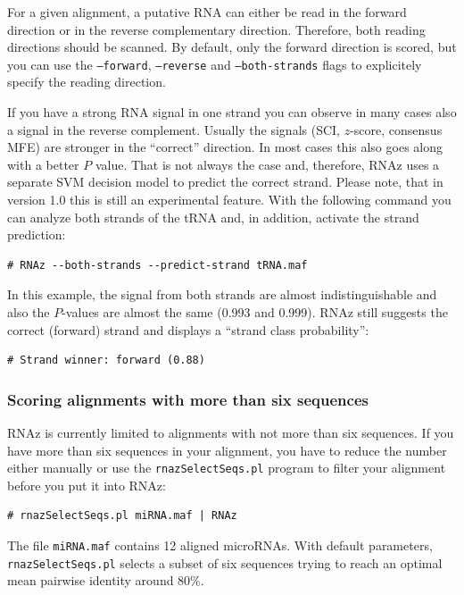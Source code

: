 \documentclass[11pt]{article}
\begin{document}
For a given alignment, a putative RNA can either be read in the forward
direction or in the reverse complementary direction. Therefore, both
reading directions should be scanned. By default, only the forward
direction is scored, but you can use the \texttt{--forward},
\texttt{--reverse} and \texttt{--both-strands} flags to explicitely specify the
reading direction. 

If you have a strong RNA signal in one strand you can observe in many cases
also a signal in the reverse complement.  Usually the signals (SCI,
$z$-score, consensus MFE) are stronger in the ``correct'' direction. In
most cases this also goes along with a better $P$ value.  That is not
always the case and, therefore, RNAz uses a separate SVM decision model to
predict the correct strand. Please note, that in version 1.0 this is still
an experimental feature. With the following command you can analyze both
strands of the tRNA and, in addition, activate the strand prediction:

\begin{verbatim}
# RNAz --both-strands --predict-strand tRNA.maf
\end{verbatim}

In this example, the signal from both strands are almost indistinguishable
and also the $P$-values are almost the same (0.993 and 0.999).
RNAz still suggests the correct (forward) strand and displays a
``strand class probability'':

\begin{verbatim}
# Strand winner: forward (0.88)
\end{verbatim}

\subsubsection{Scoring alignments with more than six sequences}
\label{sec:scor-large-alignm}

RNAz is currently limited to alignments with not more than six sequences.
If you have more than six sequences in your alignment, you have to reduce
the number either manually or use the \texttt{rnazSelectSeqs.pl} program to
filter your alignment before you put it into RNAz:

\begin{verbatim}
# rnazSelectSeqs.pl miRNA.maf | RNAz
\end{verbatim}

The file \texttt{miRNA.maf} contains 12 aligned microRNAs. With default
parameters,\\ \texttt{rnazSelectSeqs.pl} selects a subset of six sequences
trying to reach an optimal mean pairwise identity around 80\%.
\end{document}
